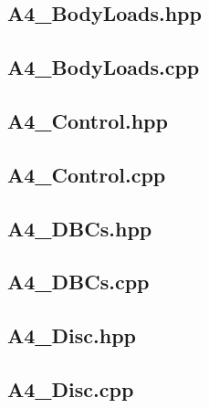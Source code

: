 \documentclass[a4paper, 12pt]{article}
\begin{document}
\subsection{A4\_BodyLoads.hpp} \label{subsec:BLhpp}


\subsection{A4\_BodyLoads.cpp} \label{subsec:BLcpp}


\subsection{A4\_Control.hpp} \label{subsec:Cont.hpp}


\subsection{A4\_Control.cpp} \label{subsec:Cont.cpp}


\subsection{A4\_DBCs.hpp} \label{subsec:DBCs.hpp}


\subsection{A4\_DBCs.cpp} \label{subsec:DBCs.cpp}


\subsection{A4\_Disc.hpp} \label{subsec:Disc.hpp}


\subsection{A4\_Disc.cpp} \label{subsec:Disc.cpp}

\end{document}
